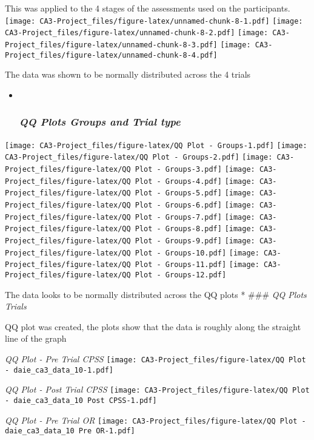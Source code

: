 \documentclass[
]{article}
\begin{document}
This was applied to the 4 stages of the assessments used on the
participants.
\texttt{[image: CA3-Project\_files/figure-latex/unnamed-chunk-8-1.pdf]}
\texttt{[image: CA3-Project\_files/figure-latex/unnamed-chunk-8-2.pdf]}
\texttt{[image: CA3-Project\_files/figure-latex/unnamed-chunk-8-3.pdf]}
\texttt{[image: CA3-Project\_files/figure-latex/unnamed-chunk-8-4.pdf]}

The data was shown to be normally distributed across the 4 trials

\begin{itemize}
\item ~
  \hypertarget{qq-plots-groups-and-trial-type}{%
  \subsubsection{\texorpdfstring{\emph{QQ Plots Groups and Trial
  type}}{QQ Plots Groups and Trial type}}\label{qq-plots-groups-and-trial-type}}
\end{itemize}

\texttt{[image: CA3-Project\_files/figure-latex/QQ Plot - Groups-1.pdf]}
\texttt{[image: CA3-Project\_files/figure-latex/QQ Plot - Groups-2.pdf]}
\texttt{[image: CA3-Project\_files/figure-latex/QQ Plot - Groups-3.pdf]}
\texttt{[image: CA3-Project\_files/figure-latex/QQ Plot - Groups-4.pdf]}
\texttt{[image: CA3-Project\_files/figure-latex/QQ Plot - Groups-5.pdf]}
\texttt{[image: CA3-Project\_files/figure-latex/QQ Plot - Groups-6.pdf]}
\texttt{[image: CA3-Project\_files/figure-latex/QQ Plot - Groups-7.pdf]}
\texttt{[image: CA3-Project\_files/figure-latex/QQ Plot - Groups-8.pdf]}
\texttt{[image: CA3-Project\_files/figure-latex/QQ Plot - Groups-9.pdf]}
\texttt{[image: CA3-Project\_files/figure-latex/QQ Plot - Groups-10.pdf]}
\texttt{[image: CA3-Project\_files/figure-latex/QQ Plot - Groups-11.pdf]}
\texttt{[image: CA3-Project\_files/figure-latex/QQ Plot - Groups-12.pdf]}

The data looks to be normally distributed across the QQ plots * \#\#\#
\emph{QQ Plots Trials}

QQ plot was created, the plots show that the data is roughly along the
straight line of the graph

\emph{QQ Plot - Pre Trial CPSS}
\texttt{[image: CA3-Project\_files/figure-latex/QQ Plot - daie\_ca3\_data\_10-1.pdf]}

\emph{QQ Plot - Post Trial CPSS}
\texttt{[image: CA3-Project\_files/figure-latex/QQ Plot - daie\_ca3\_data\_10 Post CPSS-1.pdf]}

\emph{QQ Plot - Pre Trial OR}
\texttt{[image: CA3-Project\_files/figure-latex/QQ Plot - daie\_ca3\_data\_10 Pre OR-1.pdf]}
\end{document}
